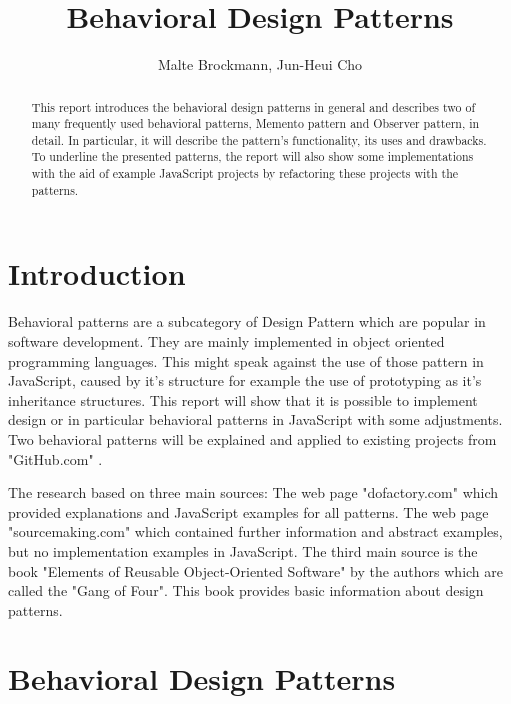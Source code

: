 \documentclass{bioinfo}
\begin{document}

\title[Behavioral Design Patterns]{Behavioral Design Patterns}
\author[Malte Brockmann, Jun-Heui Cho]{Malte Brockmann, Jun-Heui Cho}
\address{Department of Bioinformatics, Technische Universit\"at M\"unchen}
\history{}


\maketitle

\begin{abstract}
This report introduces the behavioral design patterns in general and describes two of many frequently used behavioral patterns, Memento pattern and Observer pattern, in detail. In particular, it will describe the pattern's functionality, its uses and drawbacks. To underline the presented patterns, the report will also show some implementations with the aid of example JavaScript projects by refactoring these projects with the patterns.
\end{abstract}

\section{Introduction}
Behavioral patterns are a subcategory of Design Pattern which are popular in software development. They are mainly implemented in object oriented programming languages. This might speak against the use of those pattern in JavaScript, caused by it's structure for example the use of prototyping as it's  inheritance structures. This report will show that it is possible to implement design or in particular behavioral patterns in JavaScript with some adjustments. Two behavioral patterns will be explained and applied to existing projects from "GitHub.com" \cite{github}.

The research  based on three main sources: The web page "dofactory.com" \cite{dofac} which provided explanations and JavaScript examples for all patterns. The web page "sourcemaking.com" \cite{sourcem} which contained further information  and abstract examples, but no implementation examples in JavaScript. The third main source is the book "Elements of Reusable Object-Oriented Software" by the authors which are called the "Gang of Four". \cite{gang4} This book provides basic information about design patterns. 

\section{Behavioral Design Patterns}
\end{document}
